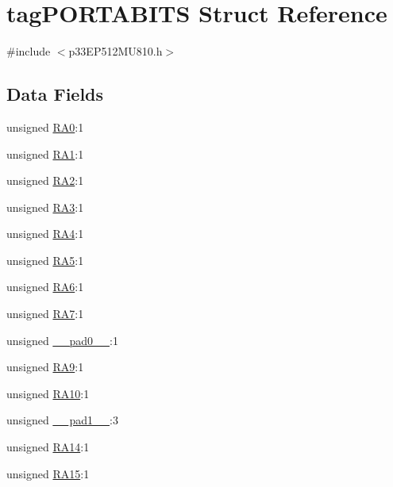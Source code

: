\hypertarget{structtag_p_o_r_t_a_b_i_t_s}{}\section{tag\+P\+O\+R\+T\+A\+B\+I\+TS Struct Reference}
\label{structtag_p_o_r_t_a_b_i_t_s}


{\ttfamily \#include $<$p33\+E\+P512\+M\+U810.\+h$>$}

\subsection*{Data Fields}
\begin{DoxyCompactItemize}
\item 
unsigned \hyperlink{structtag_p_o_r_t_a_b_i_t_s_af4aee82db0f331ec487c285162ad2080}{R\+A0}\+:1
\item 
unsigned \hyperlink{structtag_p_o_r_t_a_b_i_t_s_aad482be2ea46f93c566836a5bacfe8fa}{R\+A1}\+:1
\item 
unsigned \hyperlink{structtag_p_o_r_t_a_b_i_t_s_aca53d3d1278cccb09266cdfd28b3a228}{R\+A2}\+:1
\item 
unsigned \hyperlink{structtag_p_o_r_t_a_b_i_t_s_a8f3ec177e486f325d3de3c056086a252}{R\+A3}\+:1
\item 
unsigned \hyperlink{structtag_p_o_r_t_a_b_i_t_s_a5f92d429d1d98799d3eb06228f1aa981}{R\+A4}\+:1
\item 
unsigned \hyperlink{structtag_p_o_r_t_a_b_i_t_s_aa9e7a4dcc7895d60622615c1907930ec}{R\+A5}\+:1
\item 
unsigned \hyperlink{structtag_p_o_r_t_a_b_i_t_s_a3a0d1ef28657c29e7f6ca18daeaf9007}{R\+A6}\+:1
\item 
unsigned \hyperlink{structtag_p_o_r_t_a_b_i_t_s_a01407df9dffc53b85b510d2b2449fa99}{R\+A7}\+:1
\item 
unsigned \hyperlink{structtag_p_o_r_t_a_b_i_t_s_adf71f3d8410c1f1dbbc96680a92c49af}{\+\_\+\+\_\+pad0\+\_\+\+\_\+}\+:1
\item 
unsigned \hyperlink{structtag_p_o_r_t_a_b_i_t_s_a1b3e9550894e5112a74fda35b6bff3d9}{R\+A9}\+:1
\item 
unsigned \hyperlink{structtag_p_o_r_t_a_b_i_t_s_a167c22d2ef0863ff190a7fab40b43708}{R\+A10}\+:1
\item 
unsigned \hyperlink{structtag_p_o_r_t_a_b_i_t_s_acaf2d0924a107ec6e8d2e31febaf66f9}{\+\_\+\+\_\+pad1\+\_\+\+\_\+}\+:3
\item 
unsigned \hyperlink{structtag_p_o_r_t_a_b_i_t_s_ade7be12655f27586149e134f203fd55f}{R\+A14}\+:1
\item 
unsigned \hyperlink{structtag_p_o_r_t_a_b_i_t_s_ab563c2dd86b219fe5f0d4b27e14cada7}{R\+A15}\+:1
\end{DoxyCompactItemize}


